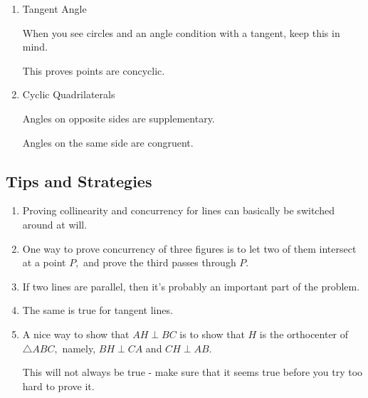 \begin{enumerate}
\begin{itemize}
    \end{itemize}
    
    \item Tangent Angle
    
    \begin{itemize}
    
    \Item When you see circles and an angle condition with a tangent, keep this in mind.
    
    \Item This proves points are concyclic.
    
    \end{itemize}
    
    \item Cyclic Quadrilaterals
    
    \begin{itemize}
    
    \Item Angles on opposite sides are supplementary.
    
    \Item Angles on the same side are congruent.
    
    \end{itemize}
\end{enumerate}

\subsection{Tips and Strategies}

\begin{enumerate}
    \item Proving collinearity and concurrency for lines can basically be switched around at will.
    
    \item One way to prove concurrency of three figures is to let two of them intersect at a point $P,$ and prove the third passes through $P.$
    
    \item If two lines are parallel, then it's probably an important part of the problem.
    
    \item The same is true for tangent lines.
    
    \item A nice way to show that $AH\perp BC$ is to show that $H$ is the orthocenter of $\triangle ABC,$ namely, $BH\perp CA$ and $CH\perp AB.$
    \begin{itemize}
    \Item This will not always be true - make sure that it seems true before you try too hard to prove it.
    \end{itemize}
\end{enumerate}

